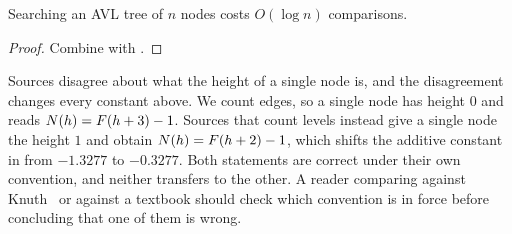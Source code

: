 \begin{corollary}
\label{cor:opcost}
Searching an AVL tree of $n$ nodes costs $O(\log n)$ comparisons.
\end{corollary}

\begin{proof}
Combine  with .
\end{proof}

\begin{remark}
\label{rem:conventions}
Sources disagree about what the height of a single node is, and the disagreement
changes every constant above. We count edges, so a single node has height $0$ and
 reads $N(h) = F(h+3) - 1$. Sources that count levels
instead give a single node the height $1$ and obtain $N(h) = F(h+2) - 1$,
which shifts the additive constant in  from $-1.3277$ to
$-0.3277$. Both statements are correct under their own convention, and neither
transfers to the other. A reader comparing  against
Knuth~\cite{knuth3} or against a textbook should check which convention is in
force before concluding that one of them is wrong.
\end{remark}
